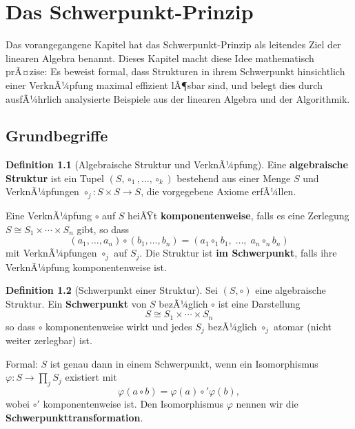 ﻿\documentclass[a4paper,12pt]{report}
\theoremstyle{definition}
\newtheorem{definition}{Definition}
\begin{document}
\chapter{Das Schwerpunkt-Prinzip}

Das vorangegangene Kapitel hat das Schwerpunkt-Prinzip als leitendes
Ziel der linearen Algebra benannt. Dieses Kapitel macht diese Idee
mathematisch prÃ¤zise: Es beweist formal, dass Strukturen in ihrem
Schwerpunkt hinsichtlich einer VerknÃ¼pfung maximal effizient lÃ¶sbar
sind, und belegt dies durch ausfÃ¼hrlich analysierte Beispiele aus
der linearen Algebra und der Algorithmik.

\section{Grundbegriffe}

\begin{definition}[Algebraische Struktur und VerknÃ¼pfung]
    Eine \textbf{algebraische Struktur} ist ein Tupel $(S, \circ_1, \ldots, \circ_k)$
    bestehend aus einer Menge $S$ und VerknÃ¼pfungen
    $\circ_j : S \times S \to S$, die vorgegebene Axiome erfÃ¼llen.

    Eine VerknÃ¼pfung $\circ$ auf $S$ heiÃŸt \textbf{komponentenweise},
    falls es eine Zerlegung $S \cong S_1 \times \cdots \times S_n$
    gibt, so dass
    \[
        (a_1, \ldots, a_n) \circ (b_1, \ldots, b_n)
        = (a_1 \circ_1 b_1,\; \ldots,\; a_n \circ_n b_n)
    \]
    mit VerknÃ¼pfungen $\circ_j$ auf $S_j$.
    Die Struktur ist \textbf{im Schwerpunkt}, falls ihre VerknÃ¼pfung
    komponentenweise ist.
\end{definition}

\begin{definition}[Schwerpunkt einer Struktur]
    Sei $(S, \circ)$ eine algebraische Struktur. Ein
    \textbf{Schwerpunkt} von $S$ bezÃ¼glich $\circ$ ist eine Darstellung
    \[
        S \cong S_1 \times \cdots \times S_n
    \]
    so dass $\circ$ komponentenweise wirkt und jedes $S_j$ bezÃ¼glich
    $\circ_j$ atomar (nicht weiter zerlegbar) ist.

    Formal: $S$ ist genau dann in einem Schwerpunkt, wenn ein
    Isomorphismus $\varphi : S \to \prod_j S_j$ existiert mit
    \[
        \varphi(a \circ b) = \varphi(a) \circ' \varphi(b),
    \]
    wobei $\circ'$ komponentenweise ist. Den Isomorphismus $\varphi$
    nennen wir die \textbf{Schwerpunkttransformation}.
\end{definition}
\end{document}
